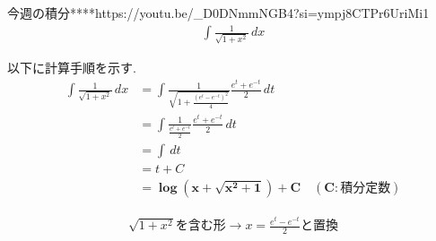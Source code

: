 \documentclass[main]{subfiles}
\begin{document}

\begin{mondai}{6}{今週の積分}{****}{https://youtu.be/_D0DNmmNGB4?si=ympj8CTPr6UriMi1}
    \begin{align*}
        \int \frac{1}{\sqrt{1+x^2}} \, dx
    \end{align*}
\end{mondai}


\solutionhead
\hfill
以下に計算手順を示す.
\hfill\
\begin{align*}
    \int \frac{1}{\sqrt{1+x^2}} \, dx
        &= \int \frac{1}{\sqrt{1+\frac{\left(e^t-e^{-t}\right)^2}{4}}} \frac{e^t+e^{-t}}{2} \, dt \\
        &= \int \frac{1}{\frac{e^t+e^{-t}}{2}}\frac{e^t+e^{-t}}{2} \, dt \\
        &= \int \, dt \\
        &= t+C \\
        &= \boldsymbol{\log \left(x+\sqrt{x^2+1}\right)+C \quad (C:\textbf{積分定数})}
\end{align*}

\begin{focusbox}
\centering
\vspace*{-0.9\baselineskip}
\begin{align*}
    \sqrt{1+x^2}\text{を含む形}\rightarrow x=\frac{e^t-e^{-t}}{2} \text{と置換}
\end{align*}
\end{focusbox}
\end{document}
